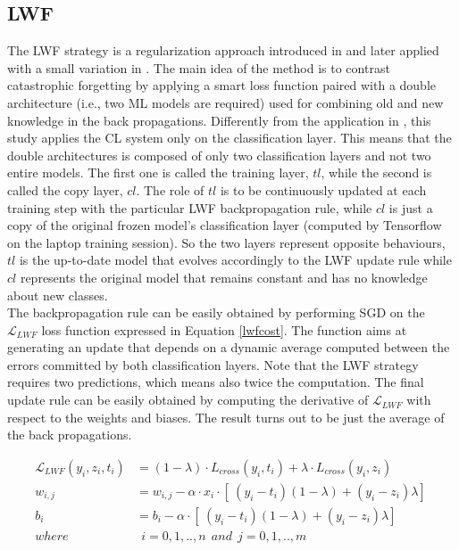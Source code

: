 \documentclass[12pt]{report}
\begin{document}
\subsection{LWF}
The LWF strategy is a regularization approach introduced in \cite{li2017learning} and later applied with a small variation in \cite{maltoni2019continuous}. The main idea of the method is to contrast catastrophic forgetting by applying a smart loss function paired with a double architecture (i.e., two ML models are required) used for combining old and new knowledge in the back propagations. Differently from the application in \cite{maltoni2019continuous}, this study applies the CL system only on the classification layer. This means that the double architectures is composed of only two classification layers and not two entire models. The first one is called the training layer, $tl$, while the second is called the copy layer, $cl$. The role of $tl$ is to be continuously updated at each training step with the particular LWF backpropagation rule, while $cl$ is just a copy of the original frozen model's classification layer (computed by Tensorflow on the laptop training session). So the two layers represent opposite behaviours, $tl$ is the up-to-date model that evolves accordingly to the LWF update rule while $cl$ represents the original model that remains constant and has no knowledge about new classes. \\
The backpropagation rule can be easily obtained by performing SGD on the $\mathcal{L}_{LWF}$ loss function expressed in Equation \ref{lwfcost}. The function aims at generating an update that depends on a dynamic average computed between the errors committed by both classification layers. Note that the LWF strategy requires two predictions, which means also twice the computation. The final update rule can be easily obtained by computing the derivative of $\mathcal{L}_{LWF}$ with respect to the weights and biases. The result turns out to be just the average of the back propagations.

\begin{align}
	\mathcal{L}_{LWF} ( y_i, z_i, t_i) &=  (1-\lambda) \cdot{L}_{cross}(y_i, t_i) + \lambda \cdot{L}_{cross}(y_i, z_i) \label{lwfcost}\\
	w_{i,j} &= w_{i,j} - \alpha \cdot x_i \cdot [\ (y_i - t_i)(1-\lambda) + (y_i - z_i)\lambda ]\  \\
	b_i     &= b_i - \alpha \cdot [\ (y_i - t_i)(1-\lambda) + (y_i - z_i)\lambda ]\ \\
    where   & \: \: i= 0,1,..,n  \: \: and \: \:  j=0,1,..,m \nonumber  
\end{align}
\end{document}

